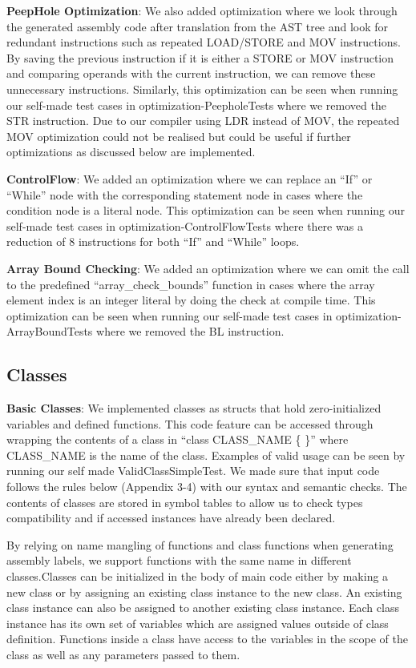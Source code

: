 \documentclass[11pt,a4paper]{article}
\begin{document}
\noindent \textbf{PeepHole Optimization}: We also added optimization where we look through the generated assembly code after translation from the AST tree and look for redundant instructions such as repeated LOAD/STORE and MOV instructions. By saving the previous instruction if it is either a STORE or MOV instruction and comparing operands with the current instruction, we can remove these unnecessary instructions. 
Similarly, this optimization can be seen when running our self-made test cases in optimization-PeepholeTests where we removed the STR instruction. Due to our compiler using LDR instead of MOV, the repeated MOV optimization could not be realised but could be useful if further optimizations as discussed below are implemented. 

\noindent \textbf{ControlFlow}: We added an optimization where we can replace an “If” or “While” node with the corresponding statement node in cases where the condition node is a literal node. This optimization can be seen when running our self-made test cases in optimization-ControlFlowTests where there was a reduction of 8 instructions for both “If” and “While” loops.

\noindent \textbf{Array Bound Checking}: We added an optimization where we can omit the call to the predefined “array\_check\_bounds” function in cases where the array element index is an integer literal by doing the check at compile time. This optimization can be seen when running our self-made test cases in optimization-ArrayBoundTests where we removed the BL instruction.

\subsection{Classes}
\noindent \textbf{Basic Classes}: We implemented classes as structs that hold zero-initialized variables and defined functions. This code feature can be accessed through wrapping the contents of a class in “class CLASS\_NAME \{ \}” where CLASS\_NAME is the name of the class. Examples of valid usage can be seen by running our self made ValidClassSimpleTest. We made sure that input code follows the rules below (Appendix 3-4) with our syntax and semantic checks. The contents of classes are stored in symbol tables to allow us to check types compatibility and if accessed instances have already been declared.

By relying on name mangling of functions and class functions when generating assembly labels, we support functions with the same name in different classes.Classes can be initialized in the body of main code either by making a new class or by assigning an existing class instance to the new class. An existing class instance can also be assigned to another existing class instance. Each class instance has its own set of variables which are assigned values outside of class definition. Functions inside a class have access to the variables in the scope of the class as well as any parameters passed to them. 
\end{document}
